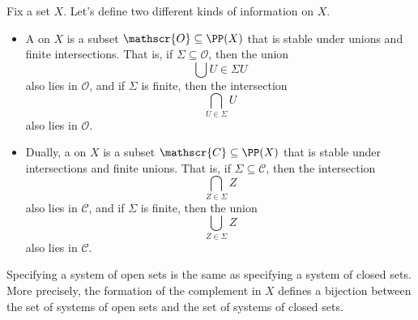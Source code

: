 \begin{dfn}
	Fix a set $X$.
	Let's define two different kinds of information on $X$.
	\begin{itemize}
		\item A  on $X$ is a subset $\mathscr{O}\subseteq\PP(X)$ that is stable under unions and finite intersections.
			That is, if $\Sigma\subseteq \mathscr{O}$, then the union
			\[
				\bigcup{U\in \Sigma} U
			\]
			also lies in $ \mathscr{O}$,
			and if $\Sigma$ is finite, then the intersection
			\[
				\bigcap_{U\in \Sigma} U
			\]
			also lies in $\mathscr{O}$.
		\item Dually, a  on $X$ is a subset $\mathscr{C}\subseteq\PP(X)$ that is stable under intersections and finite unions.
			That is, if $\Sigma \subseteq\mathscr{C}$, then the intersection
			\[
				\bigcap_{Z\in\Sigma} Z
			\]
			also lies in $\mathscr{C}$,
			and if $\Sigma$ is finite, then the union
			\[
				\bigcup_{Z\in\Sigma} Z
			\]
			also lies in $\mathscr{C}$.
	\end{itemize}
\end{dfn}

Specifying a system of open sets is the same as specifying a system of closed sets.
More precisely, the formation of the complement in $X$ defines a bijection between the set of systems of open sets and the set of systems of closed sets.

